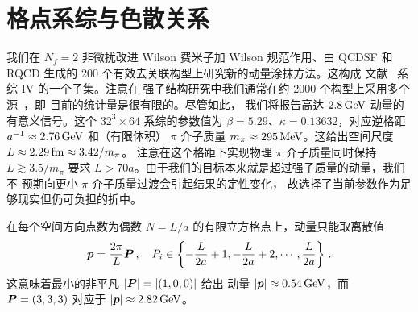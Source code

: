\section{格点系综与色散关系}
\label{sec:simulate}
我们在 $N_f=2$ 非微扰改进 Wilson 费米子加 Wilson 规范作用、由 QCDSF
和 RQCD 生成的 200 个有效去关联构型上研究新的动量涂抹方法。这构成
文献~\cite{Bali:2014gha} 系综 IV 的一个子集。注意在
强子结构研究中我们通常在约 2000 个构型上采用多个源~\cite{Bali:2014gha}，即
目前的统计量是很有限的。尽管如此，
我们将报告高达 $2.8\,\textmd{GeV}$ 动量的有意义信号。这个 $32^3\times 64$ 系综的参数值为
$\beta=5.29$、$\kappa=0.13632$，对应逆格距
$a^{-1}\approx 2.76\,\textmd{GeV}$ 和（有限体积）
$\pi$ 介子质量 $m_{\pi}\approx 295\,\textmd{MeV}$。这给出空间尺度
$L\approx 2.29\,\textmd{fm}\approx 3.42/m_{\pi}$。
注意在这个格距下实现物理 $\pi$ 介子质量同时保持 $L\gtrsim 3.5/m_{\pi}$ 要求 $L>70a$。由于我们的目标本来就是超过强子质量的动量，我们不
预期向更小 $\pi$ 介子质量过渡会引起结果的定性变化，
故选择了当前参数作为足够现实但仍可负担的折中。

在每个空间方向点数为偶数 $N=L/a$ 的有限立方格点上，动量只能取离散值
\begin{equation}
\label{quantize}
\boldsymbol{p}=\frac{2\pi}{L}\boldsymbol{P}\,,\quad
P_i\in\left\{-\frac{L}{2a}+1,-\frac{L}{2a}+2,\cdots, \frac{L}{2a}\right\}\,.
\end{equation}
这意味着最小的非平凡 $|\boldsymbol{P}|=|(1,0,0)|$ 给出
动量 $|\boldsymbol{p}|\approx 0.54\,\textmd{GeV}$，而
$\boldsymbol{P}=(3,3,3)$ 对应于 $|\boldsymbol{p}|\approx 2.82\,\textmd{GeV}$。

